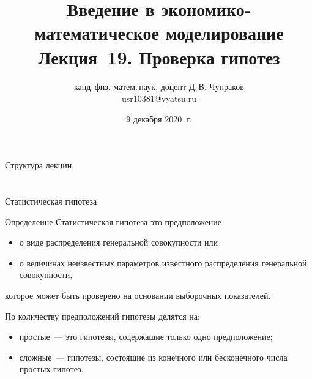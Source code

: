 \documentclass[unicode,11pt,notheorems,xcolor=table]{beamer}
\author[Д.\,В. Чупраков]{канд.\,физ.-матем.\,наук, доцент Д.\,В. Чупраков\\[6pt] usr10381@vyatsu.ru}
\institute[ВятГУ]{ФГБОУ ВО Вятский государственный университет}
\title[Лекция~19. Проверка гипотез -- 2]{
	Введение в экономико-математическое моделирование\\[12pt]
	Лекция~19. Проверка гипотез}
\date{9 декабря 2020~г.}
\begin{document}
\maketitle

 \begin{frame}{Структура лекции}{}
 	\tableofcontents
 \end{frame}

\section{}

\begin{frame}{Статистическая гипотеза}{}

    \begin{block}{Определеине}
    \alert{Статистическая гипотеза}
    это предположение
    \begin{itemize}
        \item о виде распределения генеральной совокупности или 
        \item о величинах неизвестных параметров известного распределения генеральной совокупности,
    \end{itemize}
    которое может быть проверено на основании выборочных показателей.
    \end{block}

    По количеству предположений гипотезы делятся на:
    \begin{itemize}
        \item простые~--- это гипотезы, содержащие только одно предположение;
        \item сложные~--- гипотезы, состоящие из конечного или бесконечного числа простых гипотез.    
    \end{itemize}
\end{frame}
\end{document}
